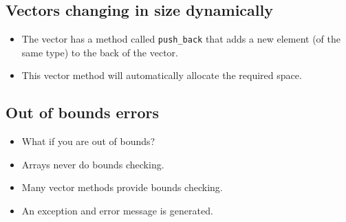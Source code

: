 \subsection{Vectors changing in size dynamically}
\begin{itemize}
    \item The vector has a method called \verb|push_back| that adds a new element (of the same type) to the back of the vector.
    \item This vector method will automatically allocate the required space.
\end{itemize}

\subsection{Out of bounds errors}
\begin{itemize}
    \item What if you are out of bounds?
    \item Arrays never do bounds checking.
    \item Many vector methods provide bounds checking.
    \item An exception and error message is generated.
\end{itemize}
